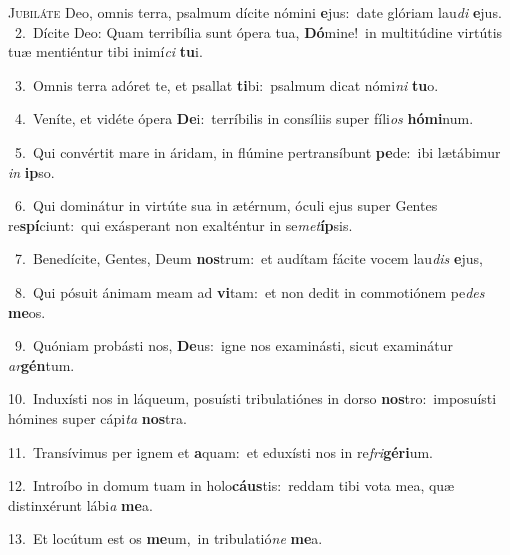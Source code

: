 \lettrine{\initial\textcolor{\initialcolor}{J}}{ubiláte} Deo, omnis terra, psalmum dícite nómini \textbf{e}\-jus:~\star date glóriam lau\textit{di} \textbf{e}\-jus.\\
{\numbfont\textcolor{\numbcolor}{~2.}}~Dícite Deo: Quam terribília sunt ópera tua, \textbf{Dó}\-mine!~\star in multitúdine virtútis tuæ mentiéntur tibi inimí\textit{ci} \textbf{tu}\-i.\par
{\numbfont\textcolor{\numbcolor}{~3.}}~Omnis terra adóret te, et psallat \textbf{ti}\-bi:~\star psalmum dicat nómi\textit{ni} \textbf{tu}\-o.\par
{\numbfont\textcolor{\numbcolor}{~4.}}~Veníte, et vidéte ópera \textbf{De}\-i:~\star terríbilis in consíliis super fíli\textit{os} \textbf{hó}\-\textbf{mi}num.\par
{\numbfont\textcolor{\numbcolor}{~5.}}~Qui convértit mare in áridam, in flúmine pertransíbunt \textbf{pe}\-de:~\star ibi lætábimur \textit{in} \textbf{ip}\-so.\par
{\numbfont\textcolor{\numbcolor}{~6.}}~Qui dominátur in virtúte sua in ætérnum, óculi ejus super Gentes re\-\textbf{spí}\-ciunt:~\star qui exásperant non exalténtur in se\-\textit{met}\-\textbf{íp}sis.\par
{\numbfont\textcolor{\numbcolor}{~7.}}~Benedícite, Gentes, Deum \textbf{nos}\-trum:~\star et audítam fácite vocem lau\textit{dis} \textbf{e}\-jus,\par
{\numbfont\textcolor{\numbcolor}{~8.}}~Qui pósuit ánimam meam ad \textbf{vi}\-tam:~\star et non dedit in commotiónem pe\textit{des} \textbf{me}\-os.\par
{\numbfont\textcolor{\numbcolor}{~9.}}~Quóniam probásti nos, \textbf{De}\-us:~\star igne nos examinásti, sicut examinátur \textit{ar}\-\textbf{gén}tum.\par
{\numbfont\textcolor{\numbcolor}{10.}}~Induxísti nos in láqueum, posuísti tribulatiónes in dorso \textbf{nos}\-tro:~\star imposuísti hómines super cápi\textit{ta} \textbf{nos}\-tra.\par
{\numbfont\textcolor{\numbcolor}{11.}}~Transívimus per ignem et \textbf{a}\-quam:~\star et eduxísti nos in re\-\textit{fri}\-\textbf{gé}\textbf{ri}um.\par
{\numbfont\textcolor{\numbcolor}{12.}}~Introíbo in domum tuam in holo\-\textbf{cáus}\-tis:~\star reddam tibi vota mea, quæ distinxérunt lábi\textit{a} \textbf{me}\-a.\par
{\numbfont\textcolor{\numbcolor}{13.}}~Et locútum est os \textbf{me}\-um,~\star in tribulatió\textit{ne} \textbf{me}\-a.\par
